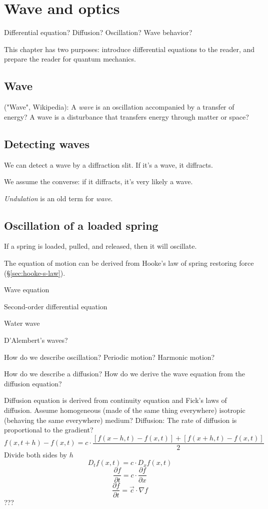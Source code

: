 \chapter{Wave and optics}

Differential equation? Diffusion? Oscillation? Wave behavior?

This chapter has two purposes:
introduce differential equations to the reader,
and prepare the reader for quantum mechanics.

\section{Wave}

("Wave", Wikipedia):
A \emph{wave} is an oscillation accompanied by a transfer of energy?
A wave is a disturbance that transfers energy through matter or space?

\section{Detecting waves}

We can detect a wave by a diffraction slit.
If it's a wave, it diffracts.

We assume the converse: if it diffracts, it's very likely a wave.

\emph{Undulation} is an old term for \emph{wave}.

\section{Oscillation of a loaded spring}

If a spring is loaded, pulled, and released, then it will oscillate.

The equation of motion can be derived from Hooke's law of spring restoring force (\S\ref{sec:hooke-s-law}).

Wave equation

Second-order differential equation

Water wave

D'Alembert's waves?

How do we describe oscillation?
Periodic motion?
Harmonic motion?

How do we describe a diffusion?
How do we derive the wave equation from the diffusion equation?

Diffusion equation is derived from continuity equation and Fick's laws of diffusion.
Assume homogeneous (made of the same thing everywhere)
isotropic (behaving the same everywhere) medium?
Diffusion:
The rate of diffusion is proportional to the gradient?
\[
    f(x,t+h) - f(x,t) = c \cdot \frac{[f(x - h, t) - f(x,t)] + [f(x + h, t) - f(x,t)]}{2}
\]
Divide both sides by \(h\)
\[
    D_t f(x,t) = c \cdot D_x f(x,t)
\]
\[
    \frac{\partial f}{\partial t} = c \cdot \frac{\partial f}{\partial x}
\]
\[
    \frac{\partial f}{\partial t} = \vec{c} \cdot \nabla f
\]
???

